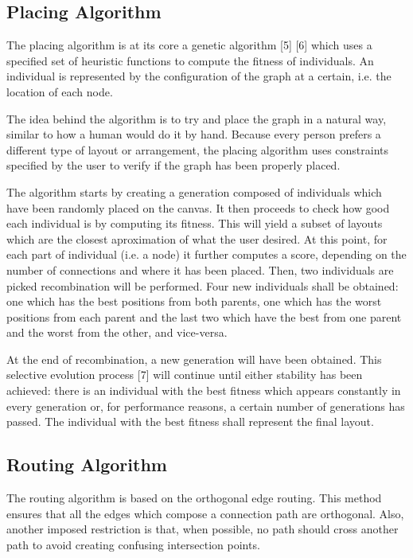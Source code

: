\label{chap:impl}

 \subsection{Placing Algorithm}
 
The placing algorithm is at its core a genetic algorithm [5] [6] which uses
a specified set of heuristic functions to compute the fitness of individuals.
An individual is represented by the configuration of the graph at a certain, i.e.
the location of each node.

The idea behind the algorithm is to try and place the graph in a natural way, similar
to how a human would do it by hand. Because every person prefers a different type of 
layout or arrangement, the placing algorithm uses constraints specified by the user
to verify if the graph has been properly placed.

The algorithm starts by creating a generation composed of individuals which have 
been randomly placed on the canvas. It then proceeds to check how good each 
individual is by computing its fitness. This will yield a subset of layouts which
are the closest aproximation of what the user desired. At this point, for each 
part of individual (i.e. a node) it further computes a score, depending on the
number of connections and where it has been placed. Then, two individuals are 
picked recombination will be performed. Four new individuals shall be obtained:
one which has the best positions from both parents, one which has the worst positions
from each parent and the last two which have the best from one parent and the 
worst from the other, and vice-versa.

At the end of recombination, a new generation will have been obtained. This selective 
evolution process [7] will continue until either stability has been achieved: there is an
individual with the best fitness which appears constantly in every generation or, for 
performance reasons, a certain number of generations has passed. The individual with 
the best fitness shall represent the final layout.

\subsection{Routing Algorithm}

The routing algorithm is based on the orthogonal edge routing. This method ensures 
that all the edges which compose a connection path are orthogonal. Also, another 
imposed restriction is that, when possible, no path should cross another path to 
avoid creating confusing intersection points.

